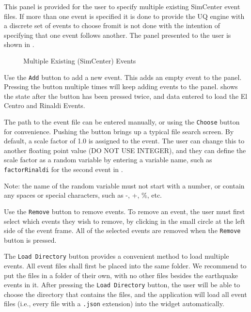This panel is provided for the user to specify multiple existing SimCenter
event files.  If more than one event is specified it is done to
provide the UQ engine with a discrete set of events to choose
from\textemdash it is not done with the intention of specifying that
one event follows another.  The panel presented to the user
is shown in .

\begin{figure}[!htbp]
  \caption{Multiple Existing (SimCenter) Events }
  \label{fig:SC_event_panel}
\end{figure}

Use the \texttt{Add} button to add a new event. This adds an empty
event to the panel. Pressing the button multiple times will keep
adding events to the panel.  shows the state after
the button has been pressed twice, and data entered to load the El Centro
and Rinaldi Events.

The path to the event file can be entered manually, or using the \texttt{Choose} button for convenience. Pushing the button brings up a typical file search screen. By default, a scale factor of 1.0 is assigned to the event.  The user
can change this to another floating point value (DO NOT USE INTEGER), and they can define the scale factor as a random variable by
entering a variable name, such as \texttt{factorRinaldi} for the second event in .

Note: the name of the random variable must not start with a number, or contain any spaces or special characters, such as -, +, \%, etc.

Use the \texttt{Remove} button to remove events. To remove an
event, the user must first select which events they wish to remove,
by clicking in the small circle at the left side of the event frame. All of the selected events are removed when the \texttt{Remove} button is pressed.

The \texttt{Load Directory} button provides a convenient method to load multiple events. All event files shall first
be placed into the same folder. We recommend to put the files in a folder of their own, with no other files besides the earthquake events in it. After pressing the \texttt{Load Directory} button, the user will be able to choose the directory that contains the files, and the
application will load all event files (i.e., every file with a \texttt{.json} 
extension) into the widget automatically. 

